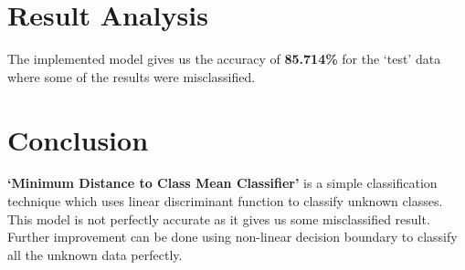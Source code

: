 \documentclass[conference]{IEEEtran}
\begin{document}
\section{Result Analysis}
The implemented model gives us the accuracy of \textbf{85.714\%} for the ‘test’ data where some of the results were misclassified.



\section{Conclusion}

\textbf{‘Minimum Distance to Class Mean Classifier’} is a simple classification technique which uses linear discriminant function to classify unknown classes. This model is not perfectly accurate as it gives us some misclassified result. Further improvement can be done using non-linear decision boundary to classify all the unknown data perfectly.
\end{document}

